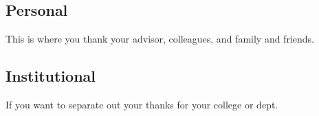 \subsection*{Personal}

This is where you thank your advisor, colleagues, and family and friends.


\subsection*{Institutional}

If you want to separate out your thanks for your college or dept.